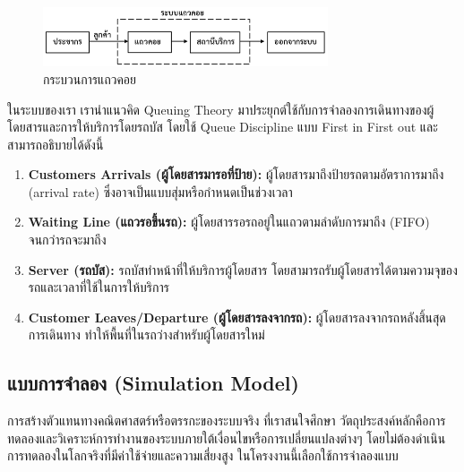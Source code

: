 \begin{figure}[h]
    \centering
    \includegraphics[width=0.75\textwidth]{Query_theory.png}
    \caption{กระบวนการแถวคอย}
    \label{fig:example}
\end{figure}
\indent ในระบบของเรา เรานำแนวคิด Queuing Theory มาประยุกต์ใช้กับการจำลองการเดินทางของผู้โดยสารและการให้บริการโดยรถบัส โดยใช้ Queue Discipline แบบ First in First out และสามารถอธิบายได้ดังนี้
\begin{enumerate}
    \item \textbf{Customers Arrivals (ผู้โดยสารมารอที่ป้าย):} ผู้โดยสารมาถึงป้ายรถตามอัตราการมาถึง (arrival rate) ซึ่งอาจเป็นแบบสุ่มหรือกำหนดเป็นช่วงเวลา
    \item \textbf{Waiting Line (แถวรอขึ้นรถ):} ผู้โดยสารรอรถอยู่ในแถวตามลำดับการมาถึง (FIFO) จนกว่ารถจะมาถึง
    \item \textbf{Server (รถบัส):} รถบัสทำหน้าที่ให้บริการผู้โดยสาร โดยสามารถรับผู้โดยสารได้ตามความจุของรถและเวลาที่ใช้ในการให้บริการ
    \item \textbf{Customer Leaves/Departure (ผู้โดยสารลงจากรถ):} ผู้โดยสารลงจากรถหลังสิ้นสุดการเดินทาง ทำให้พื้นที่ในรถว่างสำหรับผู้โดยสารใหม่
\end{enumerate}

\subsection{แบบการจำลอง (Simulation Model)}
\begin{mypara}
    \indent การสร้างตัวแทนทางคณิตศาสตร์หรือตรรกะของระบบจริง ที่เราสนใจศึกษา 
    วัตถุประสงค์หลักคือการทดลองและวิเคราะห์การทำงานของระบบภายใต้เงื่อนไขหรือการเปลี่ยนแปลงต่างๆ 
    โดยไม่ต้องดำเนินการทดลองในโลกจริงที่มีค่าใช้จ่ายและความเสี่ยงสูง ในโครงงานนี้เลือกใช้การจำลองแบบ
\end{mypara}
